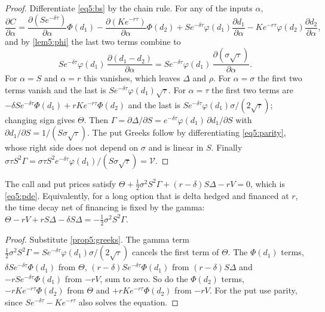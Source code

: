 \begin{chapterrefs}
\begin{proof}
Differentiate \cref{eq5:bs} by the chain rule. For any of the inputs $\alpha$,
\begin{equation*}
  \frac{\partial C}{\partial \alpha}=\frac{\partial(Se^{-\delta\tau})}{\partial \alpha}\Phi(d_1)-\frac{\partial(Ke^{-r\tau})}{\partial \alpha}\Phi(d_2)
  +Se^{-\delta\tau}\varphi(d_1)\frac{\partial d_1}{\partial \alpha}-Ke^{-r\tau}\varphi(d_2)\frac{\partial d_2}{\partial \alpha},
\end{equation*}
and by \cref{lem5:phi} the last two terms combine to
\begin{equation*}
  Se^{-\delta\tau}\varphi(d_1)\,\frac{\partial(d_1-d_2)}{\partial \alpha}=Se^{-\delta\tau}\varphi(d_1)\,\frac{\partial(\sigma\sqrt\tau)}{\partial \alpha}.
\end{equation*}
For $\alpha=S$ and $\alpha=r$ this vanishes,
which leaves $\Delta$ and $\rho$. For $\alpha=\sigma$ the first two terms vanish and the last is
$Se^{-\delta\tau}\varphi(d_1)\sqrt\tau$. For $\alpha=\tau$ the first two terms are
$-\delta Se^{-\delta\tau}\Phi(d_1)+rKe^{-r\tau}\Phi(d_2)$
and the last is $Se^{-\delta\tau}\varphi(d_1)\sigma/(2\sqrt\tau)$; changing sign gives $\Theta$. Then
$\Gamma=\partial\Delta/\partial S=e^{-\delta\tau}\varphi(d_1)\,\partial d_1/\partial S$ with
$\partial d_1/\partial S=1/(S\sigma\sqrt\tau)$. The put Greeks follow by differentiating
\cref{eq5:parity}, whose right side does not depend on $\sigma$ and is linear in $S$. Finally
$\sigma\tau S^2\Gamma=\sigma\tau S^2e^{-\delta\tau}\varphi(d_1)/(S\sigma\sqrt\tau)=\mathcal V$.
\end{proof}

\begin{proposition}\label{prop5:gammatheta}
The call and put prices satisfy $\Theta+\tfrac12\sigma^2S^2\Gamma+(r-\delta)S\Delta-rV=0$, which is
\cref{eq5:pde}. Equivalently, for a long option that is delta hedged and financed at $r$, the time
decay net of financing is fixed by the gamma: $\Theta-rV+rS\Delta-\delta S\Delta=-\tfrac12\sigma^2S^2\Gamma$.
\end{proposition}

\begin{proof}
Substitute \cref{prop5:greeks}. The gamma term $\tfrac12\sigma^2S^2\Gamma=Se^{-\delta\tau}\varphi(d_1)\sigma/(2\sqrt\tau)$
cancels the first term of $\Theta$. The $\Phi(d_1)$ terms, $\delta Se^{-\delta\tau}\Phi(d_1)$ from $\Theta$,
$(r-\delta)Se^{-\delta\tau}\Phi(d_1)$ from $(r-\delta)S\Delta$ and $-rSe^{-\delta\tau}\Phi(d_1)$ from $-rV$, sum to zero. So do the
$\Phi(d_2)$ terms, $-rKe^{-r\tau}\Phi(d_2)$ from $\Theta$ and $+rKe^{-r\tau}\Phi(d_2)$ from $-rV$. For the put use parity, since
$Se^{-\delta\tau}-Ke^{-r\tau}$ also solves the equation.
\end{proof}


\end{chapterrefs}

